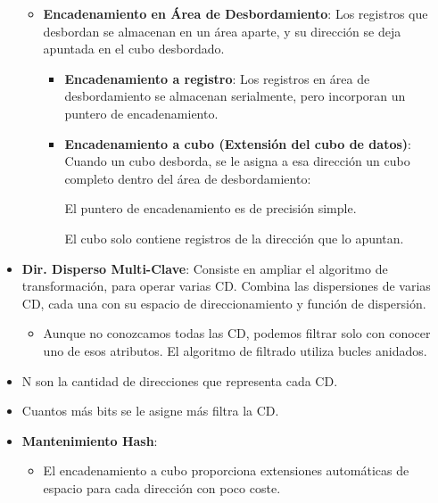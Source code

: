 \documentclass[12pt, twoside, openright]{report} %
\begin{document}
\begin{itemize}
\begin{itemize}
\begin{itemize}
        \end{itemize}
      \item \textbf{Encadenamiento en Área de Desbordamiento}: Los registros
        que desbordan se almacenan en un área aparte, y su dirección se
        deja apuntada en el cubo desbordado.
        

        \begin{itemize}
        \item \textbf{Encadenamiento a registro}: Los registros en área de
          desbordamiento se almacenan serialmente, pero incorporan un
          puntero de encadenamiento.
          
        \item \textbf{Encadenamiento a cubo (Extensión del cubo de datos)}:
          Cuando un cubo desborda, se le asigna a esa dirección un cubo
          completo dentro del área de desbordamiento:
          

         
            El puntero de encadenamiento es de precisión simple.
           
			
            El cubo solo contiene registros de la dirección que lo
            apuntan.
       
        \end{itemize}
      \end{itemize}
    \item \textbf{Dir. Disperso Multi-Clave}: Consiste en ampliar el
      algoritmo de transformación, para operar varias CD. Combina las
      dispersiones de varias CD, cada una con su espacio de
      direccionamiento y función de dispersión.
      

      \begin{itemize}
      \item Aunque no conozcamos todas las CD, podemos filtrar solo con
        conocer uno de esos atributos. El algoritmo de filtrado utiliza
        bucles anidados.
        
      \end{itemize}
    \item N son la cantidad de direcciones que representa cada CD.
      
    \item Cuantos más bits se le asigne más filtra la CD.
      
    \item \textbf{Mantenimiento Hash}:
      

      \begin{itemize}
      \item El encadenamiento a cubo proporciona extensiones automáticas de
        espacio para cada dirección con poco coste.
        

\end{itemize}
\end{itemize}
\end{document}
